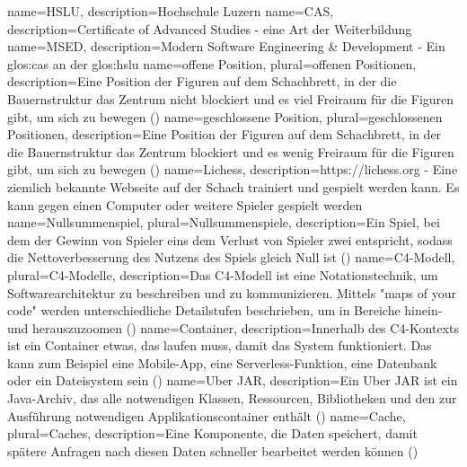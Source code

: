 {
    name=HSLU,
    description={Hochschule Luzern}
}
{
    name=CAS,
    description={Certificate of Advanced Studies - eine Art der Weiterbildung}
}
{
    name=MSED,
    description={Modern Software Engineering \& Development - Ein \gls{glos:cas} an der \gls{glos:hslu}}
}
{
    name=offene Position,
    plural=offenen Positionen,
    description={Eine Position der Figuren auf dem Schachbrett, in der die Bauernstruktur das Zentrum nicht blockiert und es viel Freiraum für die Figuren gibt, um sich zu bewegen (\cite{openclosedpositions})}
}
{
    name=geschlossene Position,
    plural=geschlossenen Positionen,
    description={Eine Position der Figuren auf dem Schachbrett, in der die Bauernstruktur das Zentrum blockiert und es wenig Freiraum für die Figuren gibt, um sich zu bewegen (\cite{openclosedpositions})}
}
{
    name=Lichess,
    description={https://lichess.org - Eine ziemlich bekannte Webseite auf der Schach trainiert und gespielt werden kann. Es kann gegen einen Computer oder weitere Spieler gespielt werden}
}
{
    name=Nullsummenspiel,
    plural=Nullsummenspiele,
    description={Ein Spiel, bei dem der Gewinn von Spieler eins dem Verlust von Spieler zwei entspricht, sodass die Nettoverbesserung des Nutzens des Spiels gleich Null ist (\cite{zerosumgame})}
}
{
    name=C4-Modell,
    plural=C4-Modelle,
    description={Das C4-Modell ist eine Notationstechnik, um Softwarearchitektur zu beschreiben und zu kommunizieren. Mittels "maps of your code" werden unterschiedliche Detailstufen beschrieben, um in Bereiche hinein- und herauszuzoomen (\cite{c4Introduction})}
}
{
    name=Container,
    description={Innerhalb des C4-Kontexts ist ein Container etwas, das laufen muss, damit das System funktioniert. Das kann zum Beispiel eine Mobile-App, eine Serverless-Funktion, eine Datenbank oder ein Dateisystem sein (\cite{c4Container})}
}
{
    name=Uber JAR,
    description={Ein Uber JAR ist ein Java-Archiv, das alle notwendigen Klassen, Ressourcen, Bibliotheken und den zur Ausführung notwendigen Applikationscontainer enthält (\cite{uberjar})}
}
{
    name=Cache,
    plural=Caches,
    description={Eine Komponente, die Daten speichert, damit spätere Anfragen nach diesen Daten schneller bearbeitet werden können (\cite{cache})}
}
